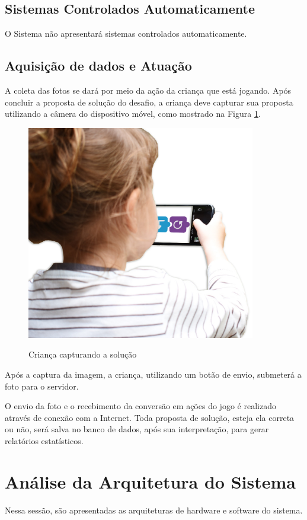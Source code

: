    \subsection{Sistemas Controlados Automaticamente}
    O Sistema não apresentará sistemas controlados automaticamente.
    
    \subsection{Aquisição de dados e Atuação}
    A coleta das fotos se dará por meio da ação da criança que está jogando. Após concluir a proposta de solução do desafio, a criança deve capturar sua proposta utilizando a câmera do dispositivo móvel, como mostrado na Figura \ref{figura:crianca_blocos}.
    
    \begin{figure}[H]
        \caption{Criança capturando a solução}
        \centering
        \includegraphics[width=10cm]{Imagens/Cap3/CriançaBlocos.jpg}
        \label{figura:crianca_blocos}
    \end{figure}
    
    Após a captura da imagem, a criança, utilizando um botão de envio, submeterá a foto para o servidor.
    
    O envio da foto e o recebimento da conversão em ações do jogo é realizado através de conexão com a Internet.
    Toda proposta de solução, esteja ela correta ou não, será salva no banco de dados, após sua interpretação, para gerar relatórios estatísticos.


\section{Análise da Arquitetura do Sistema}
    Nessa sessão, são apresentadas as arquiteturas de hardware e software do sistema.


